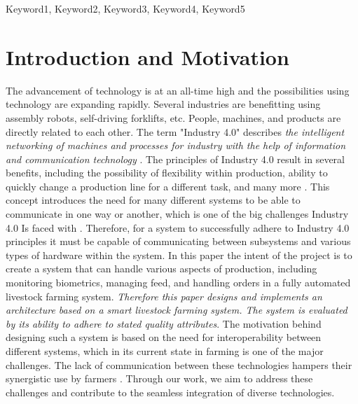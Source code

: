\documentclass[conference]{IEEEtran}
\begin{document}
\maketitle
\IEEEpubidadjcol
\begin{abstract}





\end{abstract}

\begin{IEEEkeywords}
    Keyword1, Keyword2, Keyword3, Keyword4, Keyword5
\end{IEEEkeywords}

\section{Introduction and Motivation}
The advancement of technology is at an all-time high and the possibilities using technology are expanding rapidly. Several industries are benefitting using assembly robots, self-driving forklifts, etc. People, machines, and products are directly related to each other. The term "Industry 4.0" describes \textit{the intelligent networking of machines and processes for industry with the help of information and communication technology} \cite{plattformindustrie40}. The principles of Industry 4.0 result in several benefits, including the possibility of flexibility within production, ability to quickly change a production line for a different task, and many more \cite{plattformindustrie40}. \newline
This concept introduces the need for many different systems to be able to communicate in one way or another, which is one of the big challenges Industry 4.0 Is faced with \cite{PANETTO2019198}. Therefore, for a system to successfully adhere to Industry 4.0 principles it must be capable of communicating between subsystems and various types of hardware within the system. \newline
In this paper the intent of the project is to create a system that can handle various aspects of production, including monitoring biometrics, managing feed, and handling orders in a fully automated livestock farming system. \newline
\textit{Therefore this paper designs and implements an architecture based on a smart livestock farming system. The system is evaluated by its ability to adhere to stated quality attributes}.
The motivation behind designing such a system is based on the need for interoperability between different systems, which in its current state in farming is one of the major challenges. The lack of communication between these technologies hampers their synergistic use by farmers \cite{app122412844}. Through our work, we aim to address these challenges and contribute to the seamless integration of diverse technologies.
\end{document}
